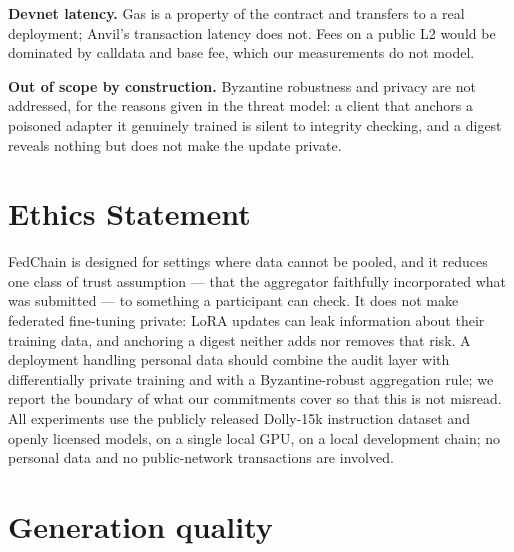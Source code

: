 \documentclass[11pt]{article}
\begin{document}
\textbf{Devnet latency.} Gas is a property of the contract and transfers to a real deployment; Anvil's transaction latency does not. Fees on a public L2 would be dominated by calldata and base fee, which our measurements do not model.

\textbf{Out of scope by construction.} Byzantine robustness and privacy are not addressed, for the reasons given in the threat model: a client that anchors a poisoned adapter it genuinely trained is silent to integrity checking, and a digest reveals nothing but does not make the update private.

\section*{Ethics Statement}

FedChain is designed for settings where data cannot be pooled, and it reduces one class of trust assumption --- that the aggregator faithfully incorporated what was submitted --- to something a participant can check. It does not make federated fine-tuning private: LoRA updates can leak information about their training data, and anchoring a digest neither adds nor removes that risk. A deployment handling personal data should combine the audit layer with differentially private training and with a Byzantine-robust aggregation rule; we report the boundary of what our commitments cover so that this is not misread. All experiments use the publicly released Dolly-15k instruction dataset and openly licensed models, on a single local GPU, on a local development chain; no personal data and no public-network transactions are involved.




\appendix

\section{Generation quality}
\label{sec:appendix-gen}
\end{document}
